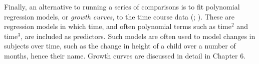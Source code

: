 Finally, an alternative to running a series of comparisons
is to fit polynomial regression models, or \emph{growth curves},
to the time course data
(\citealp{Falke2013};
 \citealp[see][for an introduction to this method in eye tracking research]{Mirman2014}).
These are regression models in which time,
and often polynomial terms such as time$^2$ and time$^3$,
are included as predictors.
Such models are often used to model changes in subjects over time,
such as the change in height of a child over a number of months, hence their name.
Growth curves are discussed in detail in Chapter 6.


